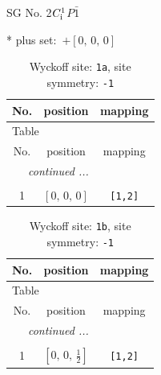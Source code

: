 \documentclass[fleqn,8pt]{jsarticle}
\begin{document}
\setcounter{MaxMatrixCols}{32}

\renewcommand{\tablename}{Table~}
\renewcommand{\figurename}{Figure~}
\begin{center}
\LARGE
SG No. 2\quad$C_{\rm i}^{1}$\quad$P\bar{1}$\quad[ triclinic ]
\end{center}
* plus set:\,\,\,$+\left[ 0,\, 0,\, 0 \right]$
\renewcommand{\arraystretch}{1.2}
\begin{longtable}{ccc}
\caption{Wyckoff site: {\tt 1a}, site symmetry: {\tt -1}}
 \\
 \hline \hline
No. & position & mapping \\ \hline \endfirsthead

\multicolumn{2}{l}{\tablename\ \thetable{}} \\
 \hline \hline
No. & position & mapping \\ \hline \endhead

 \hline \hline
\multicolumn{2}{r}{\footnotesize\it continued ...} \\ \endfoot

 \hline \hline
\multicolumn{2}{r}{} \\ \endlastfoot

1 & $\left[ 0,\, 0,\, 0 \right]$ & {\tt [1,2]} \\
\end{longtable}
\renewcommand{\arraystretch}{1.2}
\begin{longtable}{ccc}
\caption{Wyckoff site: {\tt 1b}, site symmetry: {\tt -1}}
 \\
 \hline \hline
No. & position & mapping \\ \hline \endfirsthead

\multicolumn{2}{l}{\tablename\ \thetable{}} \\
 \hline \hline
No. & position & mapping \\ \hline \endhead

 \hline \hline
\multicolumn{2}{r}{\footnotesize\it continued ...} \\ \endfoot

 \hline \hline
\multicolumn{2}{r}{} \\ \endlastfoot

1 & $\left[ 0,\, 0,\, \frac{1}{2} \right]$ & {\tt [1,2]} \\
\end{longtable}
\renewcommand{\arraystretch}{1.2}
\end{document}
